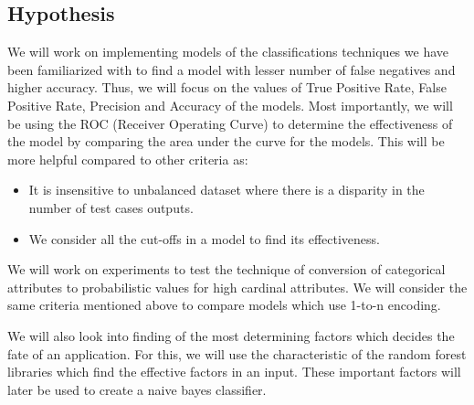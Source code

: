 \documentclass{article} %
\begin{document}
\subsection{Hypothesis}
We will work on implementing models of the classifications techniques we have been familiarized with to find a model with lesser number of false negatives and higher accuracy. Thus, we will focus on the values of True Positive Rate, False Positive Rate, Precision and Accuracy of the models. Most importantly, we will be using the ROC (Receiver Operating Curve) to determine the effectiveness of the model by comparing the area under the curve for the models. This will be more helpful compared to other criteria as:
\begin{itemize}
	\item It is insensitive to unbalanced dataset where there is a disparity in the number of test cases outputs.  
	\item We consider all the cut-offs in a model to find its effectiveness.
\end{itemize}

We will work on experiments to test the technique of conversion of categorical attributes to probabilistic values for high cardinal attributes\cite{HighCard}. We will consider the same criteria mentioned above to compare models which use 1-to-n encoding. 

We will also look into finding of the most determining factors which decides the fate of an application. For this, we will use the characteristic of the random forest libraries which find the effective factors in an input. These important factors will later be used to create a naive bayes classifier.
\end{document}
